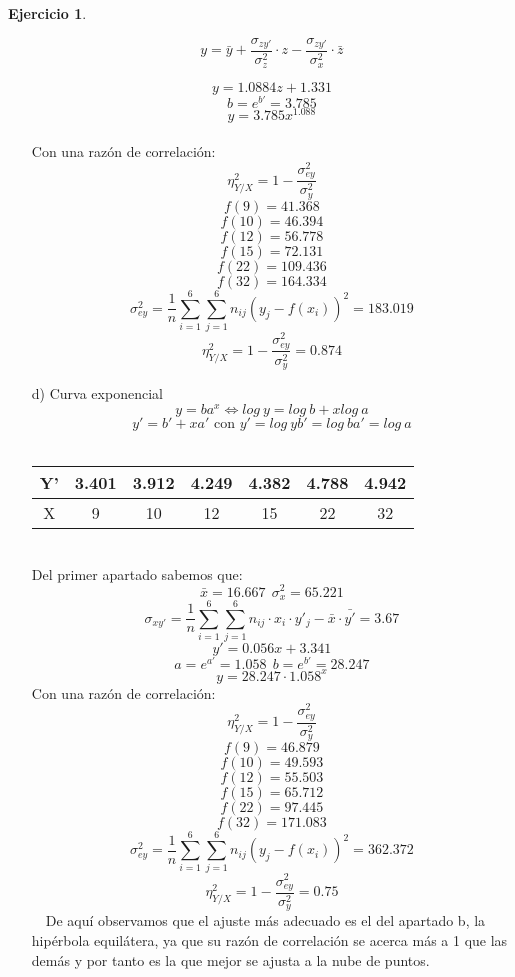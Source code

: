 \documentclass[a4paper, 12pt]{article}
\theoremstyle{definition}
\newtheorem{ej}{Ejercicio}
\begin{document}
\begin{ej}
\begin{enumerate}
    $$y = \bar{y} + \frac{\sigma_{zy'}}{\sigma_z^2}\cdot z - \frac{\sigma_{zy'}}{\sigma_x^2}\cdot \bar{z}$$
    
    $$y = 1.0884z + 1.331$$
    $$b = e^{b'} = 3.785$$
    $$y = 3.785x^{1.088}$$
    \\
    Con una razón de correlación:
    $$\eta_{Y/X}^2 = 1 - \frac{\sigma_{ey}^2}{\sigma_y^2}$$
    $$f(9) = 41.368$$
    $$f(10) = 46.394$$
    $$f(12) = 56.778$$
    $$f(15) = 72.131$$
    $$f(22) = 109.436$$
    $$f(32) = 164.334$$
    $$\sigma_{ey}^2 = \frac{1}{n} \displaystyle \sum_{i = 1}^6 \sum_{j = 1}^6 n_{ij} (y_j - f(x_i))^2 = 183.019$$
    $$\eta_{Y/X}^2 = 1 - \frac{\sigma_{ey}^2}{\sigma_y^2} = 0.874$$
    \item[d) ] Curva exponencial \\
    $$y = ba^x \iff log \ y = log \ b + xlog \ a$$
    $$y' = b' + xa' \text{ con } y' = log \ y b' = log \ b a' = log \ a$$
    \\ 
    \begin{tabular}{c|cccccc}
        Y' & 3.401 & 3.912 & 4.249 & 4.382 & 4.788 & 4.942\\ \hline
        X  & 9 & 10 & 12 & 15 & 22 & 32 
    \end{tabular} \\
    Del primer apartado sabemos que:
    $$\bar{x} = 16.667 \ \ \sigma_x^2 = 65.221$$
    $$\sigma_{xy'} = \frac{1}{n} \displaystyle \sum_{i = 1}^6 \sum_{j = 1}^6 n_{ij} \cdot x_i \cdot y'_j - \bar{x} \cdot \bar{y'} = 3.67$$
    $$y' = 0.056x + 3.341$$
    $$a = e^{a'} = 1.058 \ \ b = e^{b'} = 28.247$$
    $$y = 28.247 \cdot 1.058^x$$
     Con una razón de correlación:
    $$\eta_{Y/X}^2 = 1 - \frac{\sigma_{ey}^2}{\sigma_y^2}$$
    $$f(9) = 46.879$$
    $$f(10) = 49.593$$
    $$f(12) = 55.503$$
    $$f(15) = 65.712$$
    $$f(22) = 97.445$$
    $$f(32) = 171.083$$
    $$\sigma_{ey}^2 = \frac{1}{n} \displaystyle \sum_{i = 1}^6 \sum_{j = 1}^6 n_{ij} (y_j - f(x_i))^2 = 362.372$$
    $$\eta_{Y/X}^2 = 1 - \frac{\sigma_{ey}^2}{\sigma_y^2} = 0.75$$
    \
    \
    De aquí observamos que el ajuste más adecuado es el del apartado b, la hipérbola equilátera, ya que su razón de correlación se acerca más a 1 que las demás y por tanto es la que mejor se ajusta a la nube de puntos.
    \end{enumerate}
\end{ej}
\end{document}
